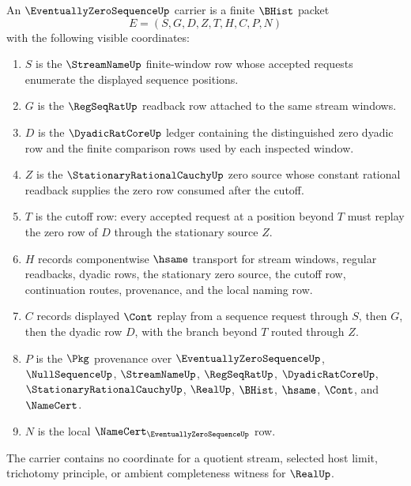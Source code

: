 \begin{definition}
\label{def:eventually-zero-sequence-carrier}
An $\EventuallyZeroSequenceUp$ carrier is a finite $\BHist$ packet
$$
E=(S,G,D,Z,T,H,C,P,N)
$$
with the following visible coordinates:
\begin{enumerate}
\item $S$ is the $\StreamNameUp$ finite-window row whose accepted requests enumerate the displayed sequence positions.
\item $G$ is the $\RegSeqRatUp$ readback row attached to the same stream windows.
\item $D$ is the $\DyadicRatCoreUp$ ledger containing the distinguished zero dyadic row and the finite comparison rows used by each inspected window.
\item $Z$ is the $\StationaryRationalCauchyUp$ zero source whose constant rational readback supplies the zero row consumed after the cutoff.
\item $T$ is the cutoff row: every accepted request at a position beyond $T$ must replay the zero row of $D$ through the stationary source $Z$.
\item $H$ records componentwise $\hsame$ transport for stream windows, regular readbacks, dyadic rows, the stationary zero source, the cutoff row, continuation routes, provenance, and the local naming row.
\item $C$ records displayed $\Cont$ replay from a sequence request through $S$, then $G$, then the dyadic row $D$, with the branch beyond $T$ routed through $Z$.
\item $P$ is the $\Pkg$ provenance over $\EventuallyZeroSequenceUp$, $\NullSequenceUp$, $\StreamNameUp$, $\RegSeqRatUp$, $\DyadicRatCoreUp$, $\StationaryRationalCauchyUp$, $\RealUp$, $\BHist$, $\hsame$, $\Cont$, and $\NameCert$.
\item $N$ is the local $\NameCert_{\EventuallyZeroSequenceUp}$ row.
\end{enumerate}
The carrier contains no coordinate for a quotient stream, selected host limit, trichotomy principle, or ambient completeness witness for $\RealUp$.
\end{definition}

